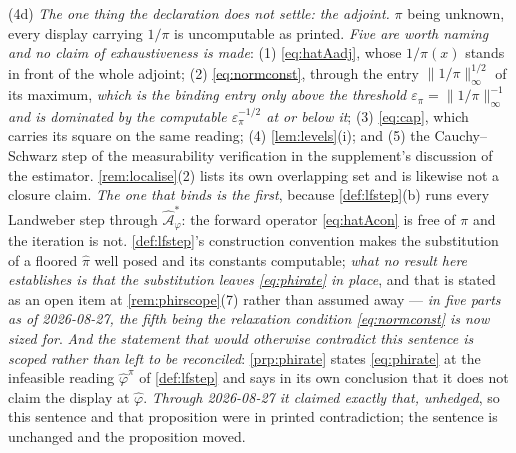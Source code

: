 \begin{remark}
\begin{enumerate}
\textup{(4d)} \emph{The one thing the declaration does not settle: the adjoint.} $\pi$ being unknown,
every display carrying $1/\pi$ is uncomputable as printed. \emph{Five are worth naming and no claim of
exhaustiveness is made}: \textup{(1)} \eqref{eq:hatAadj}, whose $1/\pi(x)$ stands in front of the whole
adjoint; \textup{(2)} \eqref{eq:normconst}, through the entry $\|1/\pi\|_\infty^{1/2}$ of its maximum,
\emph{which is the binding entry only above the threshold
$\varepsilon_\pi=\|1/\pi\|_\infty^{-1}$ and is dominated by the computable $\varepsilon_\pi^{-1/2}$ at
or below it}; \textup{(3)} \eqref{eq:cap}, which carries its square on the same reading; \textup{(4)}
\cref{lem:levels}\textup{(i)}; and \textup{(5)}
the Cauchy--Schwarz step of the measurability verification in the supplement's discussion of the
estimator. \cref{rem:localise}\textup{(2)} lists its own overlapping set
and is likewise not a closure claim. \emph{The one that binds is the first}, because
\cref{def:lfstep}\textup{(b)} runs every Landweber step through $\hat{\mathcal A}^\ast_\varphi$: the
forward operator \eqref{eq:hatAcon} is free of $\pi$ and the iteration is not.
\cref{def:lfstep}'s construction convention makes the substitution of a floored $\hat\pi$ well posed and
its constants computable; \emph{what no result here establishes is that the substitution leaves
\eqref{eq:phirate} in place}, and that is stated as an open item at
\cref{rem:phirscope}\textup{(7)} rather than assumed away --- \emph{in five parts as of 2026-08-27, the
fifth being the relaxation condition \eqref{eq:normconst} is now sized for}.
\emph{And the statement that would otherwise contradict this sentence is scoped rather than left to be
reconciled}: \cref{prp:phirate} states \eqref{eq:phirate} at the infeasible reading $\hat\varphi^{\pi}$
of \cref{def:lfstep} and says in its own conclusion that it does not claim the display at $\hat\varphi$.
\emph{Through 2026-08-27 it claimed exactly that, unhedged}, so this sentence and that proposition were
in printed contradiction; the sentence is unchanged and the proposition moved.
\end{enumerate}
\end{remark}

